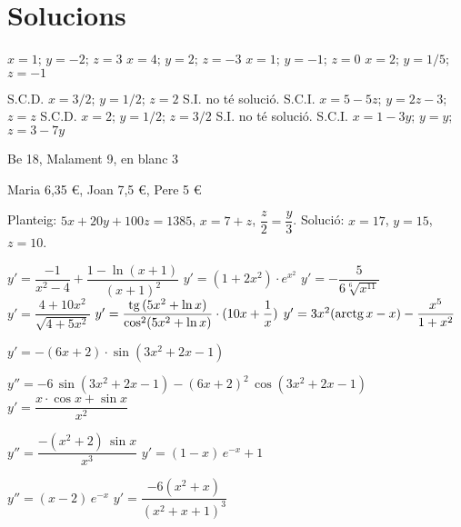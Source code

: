 \documentclass[11pt, a4paper, pdf]{article}
\let\frac\dfrac
\begin{document}
\section*{Solucions}
\setcounter{myenumi}{0}
\begin{multicols}{2}
\begin{mylist}
 
 \item  \begin{tasks}
 	\task $x=1$; $y=-2$; $z=3$ 
 	\task $x=4$; $y=2$; $z=-3$ 
 	\task $x=1$; $y=-1$; $z=0$ 
 	\task $x=2$; $y=1/5$; $z=-1$ 
 \end{tasks}
 
 \item 
 \begin{tasks}
 	\task S.C.D. $x=3/2$; $y=1/2$; $z=2$ 
 	\task S.I. no té solució. 
 	\task S.C.I. $x=5-5z$; $y=2z-3$; $z=z$ 
 	\task S.C.D. $x=2$; $y=1/2$; $z=3/2$
 	\task S.I. no té solució.
 	\task S.C.I. $x=1-3y$; $y=y$; $z=3-7y$
 \end{tasks}
  
 \item Be 18, Malament 9, en blanc 3
 
 \item Maria 6,35 \euro, Joan 7,5 \euro, Pere 5 \euro
 
 \item Planteig: $5x+20y+100z=1385$, $x=7+z$, $\frac{z}{2}=\frac{y}{3}$. Solució: $x=17$, $y=15$, $z=10$.
 
 \item \begin{tasks}
 	\task  $y'=\frac{-1}{x^2-4} + \frac{1-\ln(x+1)}{(x+1)^2}$ 
 	\task $y'=(1+2x^2)\cdot e^{x^2}$
 	\task $y'=-\frac{5}{6\sqrt[6]{x^{11}}}$
 	\task $y'=\frac{4+10x^2}{\sqrt{4+5x^2}}$
 	\task $y'=\frac{\tg(5x^2+\ln x) }{\cos^2(5x^2+\ln x)}\cdot (10x+\frac{1}{x})$
 	\task $y'=3x^2(\arctg x - x) - \frac{x^5}{1+x^2}$
 \end{tasks}

\item \begin{tasks}
	\task $y'=-(6x+2) \cdot \sin(3x^2+2x-1)$
	
	$y''=-6\,\sin(3x^2+2x-1)- (6x+2)^2\, \cos(3x^2+2x-1)$
	\task $y'=\frac{x\cdot \cos x + \sin x}{x^2}$
	
	$y''=\frac{-(x^2+2)\, \sin x}{x^3}$
	\task $y'=(1-x)\, e^{-x} + 1$
	
	$y''=(x-2) \, e^{-x}$
	\task $y'=\frac{-6(x^2+x)}{(x^2+x+1)^3}$
	

\end{tasks}
\end{mylist}
\end{multicols}
\end{document}
